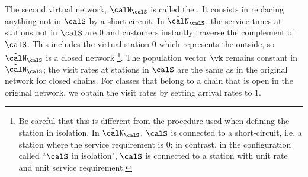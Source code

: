 The second virtual network, $\tilde{\calN}_{\calS}$ is called
the . It
consists in replacing anything not in $\calS$ by a
short-circuit. In $\tilde{\calN}_{\calS}$, the service times at
stations not in $\calS$ are $0$ and customers instantly
traverse the complement of $\calS$. This includes the virtual
station $0$ which represents the outside, so
$\tilde{\calN}_{\calS}$ is a closed network%
\footnote{Be careful that this is different from
the procedure used when defining the station in
isolation. In $\tilde{\calN}_{\calS}$, $\calS$ is
connected to a short-circuit, i.e. a station
where the service requirement is $0$; in
contrast, in the configuration called ``$\calS$
in isolation", $\calS$ is connected to a station
with unit rate and unit service requirement. }.
The population vector $\vk$ remains constant in
$\tilde{\calN}_{\calS}$; the visit rates at stations in
$\calS$ are the same as in the original network for closed chains. For classes that belong to a chain that is open in the original network, we obtain the visit rates by setting arrival rates to $1$.

